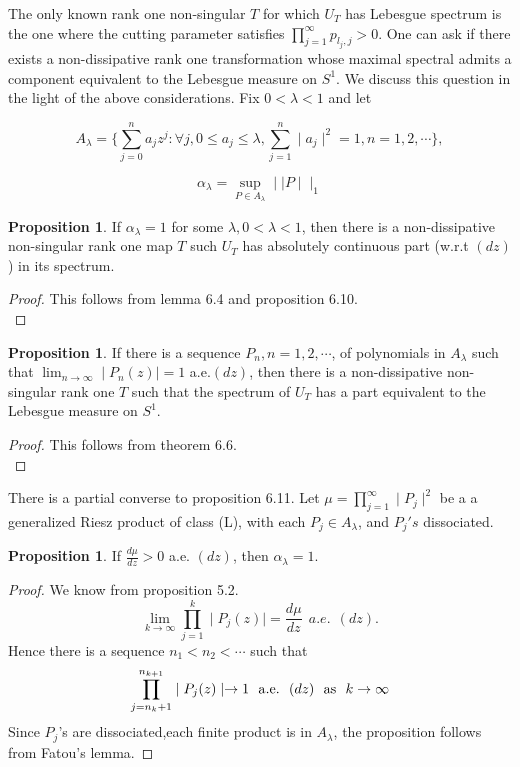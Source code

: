 \documentclass{amsart}
\theoremstyle{definition}
\newtheorem{Prop}[Th]{Proposition}
\theoremstyle{remark}
\numberwithin{equation}{section}
\newcommand{\1}{\mathbb{1}}
\begin{document}
The only known rank one non-singular $T$ for which $U_T$ has Lebesgue spectrum is the
 one where the cutting parameter satisfies $\prod_{j=1}^\infty p_{l_j,j} > 0$. One can ask  if there exists a non-dissipative  rank one transformation whose maximal spectral admits a component equivalent to the Lebesgue measure on $S^1$. We discuss this question in the light of the above considerations. Fix $0 < \lambda < 1$ and let

 $$A_{\lambda}= \Bigg\{\sum_{j=0}^na_jz^j: \forall j, 0 \leq a_j \leq \lambda,
 \sum_{j=1}^n\mid a_j\mid^2 =1, n =1,2,\cdots\Bigg\},$$



 $$\alpha_\lambda = \sup_{P\in A_\lambda}\mid\mid P\mid\mid_1$$
\begin{Prop}\label{prop1}
  If $\alpha_\lambda =1$ for some $\lambda, 0 < \lambda < 1$, then there is a non-dissipative non-singular rank one map $T$ such $U_T$ has absolutely continuous part (w.r.t $(dz)$) in its spectrum.
\end{Prop}
\begin{proof}

 This follows from lemma 6.4 and proposition 6.10.\\
\end{proof}

\begin{Prop}\label{prop1}
 If there is a sequence $P_n, n=1,2,\cdots$, of polynomials in $A_\lambda$  such that $\displaystyle\lim_{n\rightarrow \infty}\mid P_n(z)\mid = 1$ a.e.$(dz)$, then there is a non-dissipative non-singular rank one $T$ such that the spectrum of $U_T$ has a part equivalent to the Lebesgue measure on $S^1$.
\end{Prop}
\begin{proof}
 This follows from theorem 6.6.\\
\end{proof}

There is a partial converse to proposition 6.11. Let  $\mu = \prod_{j=1}^\infty \mid P_j\mid^2$ be a a generalized Riesz product of class (L), with each $P_j \in A_\lambda$, and $P_j's$ dissociated.
\begin{Prop}\label{ prop1}
If $\frac{d\mu}{dz} > 0$ a.e. $(dz)$, then $\alpha_\lambda =1$.
\end{Prop}
\begin{proof}
We know from proposition 5.2. $$\lim_{k\rightarrow \infty}\prod_{j=1}^k\mid P_j(z)\mid =\frac{d\mu}{dz} ~~a.e. ~~(dz).$$
Hence there is a sequence $n_1 < n_2 <\cdots$ such that $$\prod_{j=n_k+1}^{n_{k+1}}\mid P_j(z)\mid \rightarrow 1 ~~{\rm{a.e.}} ~~(dz) ~~{\rm{as}} ~~k\rightarrow \infty$$
Since $P_j$'s are dissociated,each finite product is in $A_\lambda$, the proposition follows from Fatou's lemma.
 \end{proof}
\end{document}
